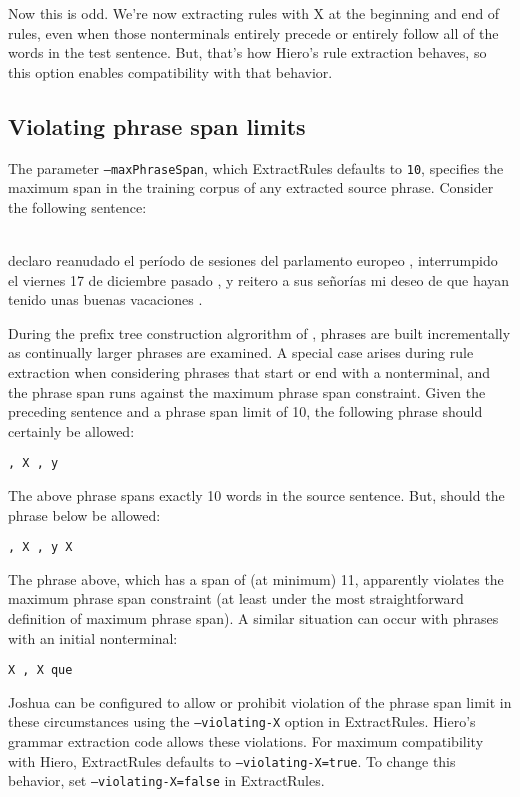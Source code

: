Now this is odd. We're now extracting rules with X at the beginning and end of rules, even when those nonterminals entirely precede or entirely follow all of the words in the test sentence. But, that's how Hiero's rule extraction behaves, so this option enables compatibility with that behavior.


\subsection{Violating phrase span limits}

The parameter {\tt --maxPhraseSpan}, which ExtractRules defaults to {\tt 10}, specifies the maximum span in the training corpus of any extracted source phrase. Consider the following sentence:

\begin{tt}
\ \\
declaro reanudado el per\'iodo de sesiones del parlamento europeo , interrumpido el viernes 17 de diciembre pasado , y reitero a sus se\~nor\'ias mi deseo de que hayan tenido unas buenas vacaciones .
\ \\
\end{tt}

During the prefix tree construction algrorithm of , phrases are built incrementally as continually larger phrases are examined.  A special case arises during rule extraction when considering phrases that start or end with a nonterminal, and the phrase span runs against the maximum phrase span constraint.  Given the preceding sentence and a phrase span limit of 10, the following phrase should certainly be allowed:

\begin{verbatim}
, X , y
\end{verbatim}

The above phrase spans exactly 10 words in the source sentence. But, should the phrase below be allowed:

\begin{verbatim}
, X , y X
\end{verbatim}

The phrase above, which has a span of (at minimum) 11, apparently violates the maximum phrase span constraint (at least under the most straightforward definition of maximum phrase span). A similar situation can occur with phrases with an initial nonterminal:

\begin{verbatim}
X , X que
\end{verbatim}

Joshua can be configured to allow or prohibit violation of the phrase span limit in these circumstances using the {\tt --violating-X} option in ExtractRules. Hiero's grammar extraction code allows these violations. For maximum compatibility with Hiero, ExtractRules defaults to {\tt --violating-X=true}. To change this behavior, set {\tt --violating-X=false} in ExtractRules.

